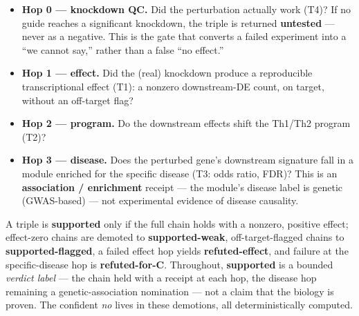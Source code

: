 \begin{itemize}
\tightlist
\item
  \textbf{Hop 0 --- knockdown QC.} Did the perturbation actually work (T4)? If no guide reaches a significant
  knockdown, the triple is returned \textbf{untested} --- never as a negative. This is the gate that converts a
  failed experiment into a ``we cannot say,'' rather than a false ``no effect.''
\item
  \textbf{Hop 1 --- effect.} Did the (real) knockdown produce a reproducible transcriptional effect (T1): a
  nonzero downstream-DE count, on target, without an off-target flag?
\item
  \textbf{Hop 2 --- program.} Do the downstream effects shift the Th1/Th2 program (T2)?
\item
  \textbf{Hop 3 --- disease.} Does the perturbed gene's downstream signature fall in a module enriched for the
  specific disease (T3: odds ratio, FDR)? This is an \textbf{association / enrichment} receipt --- the module's
  disease label is genetic (GWAS-based) --- not experimental evidence of disease causality.
\end{itemize}

A triple is \textbf{supported} only if the full chain holds with a nonzero, positive effect; effect-zero chains
are demoted to \textbf{supported-weak}, off-target-flagged chains to \textbf{supported-flagged}, a failed effect hop
yields \textbf{refuted-effect}, and failure at the specific-disease hop is \textbf{refuted-for-C}. Throughout,
\textbf{supported} is a bounded \emph{verdict label} --- the chain held with a receipt at each hop, the disease hop
remaining a genetic-association nomination --- not a claim that the biology is proven. The confident \emph{no}
lives in these demotions, all deterministically computed.

